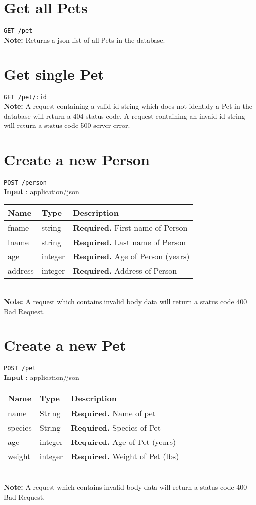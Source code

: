 \documentclass{article}
\begin{document}
\section*{Get all Pets}
\texttt{GET /pet} \\
\textbf{Note:} Returns a json list of all Pets in the database.

\section*{Get single Pet}
\texttt{GET /pet/:id} \\
\textbf{Note:} A request containing a valid id string which does not
identidy a Pet in the database will return a 404 status code. A request
containing an invaid id string will return a status code 500 server error.

\section*{Create a new Person}
\texttt{POST /person} \\
\textbf{Input} : application/json \\
\begin{tabular}{| l | l | l |}
	\hline
	\textbf{Name} & \textbf{Type} & \textbf{Description} \\
	\hline
	fname         & string        & \textbf{Required.} First name of Person \\
	\hline
	lname         & string        & \textbf{Required.} Last name of Person \\
	\hline
	age           & integer       & \textbf{Required.} Age of Person (years) \\
	\hline
	address       & integer       & \textbf{Required.} Address of Person \\
	\hline
\end{tabular} \\
\textbf{Note:} A request which contains invalid body data will return a
status code 400 Bad Request.

\section*{Create a new Pet}
\texttt{POST /pet} \\
\textbf{Input} : application/json \\
\begin{tabular}{| l | l | l |}
	\hline
	\textbf{Name} & \textbf{Type} & \textbf{Description} \\
	\hline
	name          & String        & \textbf{Required.} Name of pet \\
	\hline
	species       & String        & \textbf{Required.} Species of Pet \\
	\hline
	age           & integer       & \textbf{Required.} Age of Pet (years) \\
	\hline
	weight        & integer       & \textbf{Required.} Weight of Pet (lbs) \\
	\hline
\end{tabular} \\
\textbf{Note:} A request which contains invalid body data will return a
status code 400 Bad Request.
\end{document}
